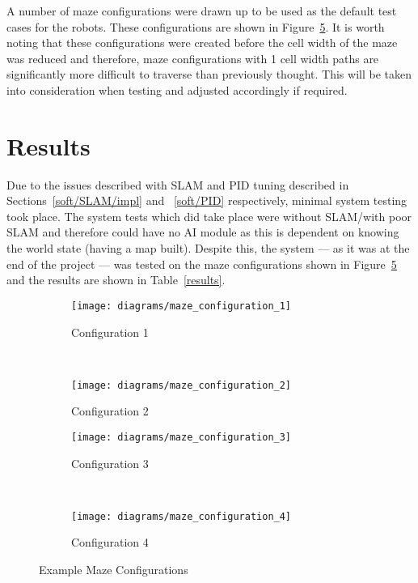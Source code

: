 A number of maze configurations were drawn up to be used as the default test
cases for the robots. These configurations are shown in Figure~\ref{fig:maze_configs}. It is worth noting that these configurations were created before the
cell width of the maze was reduced and therefore, maze configurations with 1
cell width paths are significantly more difficult to traverse than previously
thought. This will be taken into consideration when testing and adjusted
accordingly if required.


\section{Results}\label{systest/results}
Due to the issues described with SLAM and PID tuning described in Sections~\ref{soft/SLAM/impl} and ~\ref{soft/PID} respectively, 
minimal system testing took place. The system tests which did take place were 
without SLAM/with poor SLAM and therefore could have no AI module as this is 
dependent on knowing the world state (having a map built). Despite this, the 
system --- as it was at the end of the project --- was tested on the maze configurations shown in Figure~\ref{fig:maze_configs}
and the results are shown in Table~\ref{results}. 

\begin{figure}[!ht]
  \centering
  \begin{subfigure}[b]{0.3\textwidth}
    \texttt{[image: diagrams/maze\_configuration\_1]}
    \caption{Configuration 1}
    \label{fig:maze_configs/1}
  \end{subfigure}
  ~
  \begin{subfigure}[b]{0.3\textwidth}
    \texttt{[image: diagrams/maze\_configuration\_2]}
    \caption{Configuration 2}
    \label{fig:maze_configs/2}
  \end{subfigure}

  \begin{subfigure}[b]{0.3\textwidth}
    \texttt{[image: diagrams/maze\_configuration\_3]}
    \caption{Configuration 3}
    \label{fig:maze_configs/3}
  \end{subfigure}
  ~
  \begin{subfigure}[b]{0.3\textwidth}
    \texttt{[image: diagrams/maze\_configuration\_4]}
    \caption{Configuration 4}
    \label{fig:maze_configs/4}
  \end{subfigure}
  \caption{Example Maze Configurations}\label{fig:maze_configs}
\end{figure}

